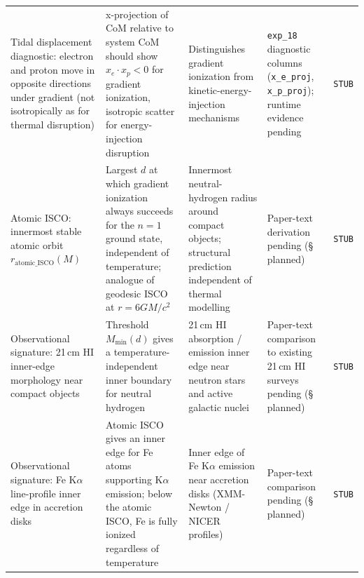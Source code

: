 {\begin{longtable}{@{}p{2.8cm}p{3.6cm}p{3.6cm}p{4.0cm}p{1.0cm}@{}}
Tidal displacement diagnostic:
electron and proton move in opposite directions under gradient
(not isotropically as for thermal disruption)
    & x-projection of CoM relative to system CoM should show
      $x_e \cdot x_p < 0$ for gradient ionization, isotropic
      scatter for energy-injection disruption
    & Distinguishes gradient ionization from
      kinetic-energy-injection mechanisms
    & \texttt{exp\_18} diagnostic columns
      (\texttt{x\_e\_proj}, \texttt{x\_p\_proj}); runtime evidence
      pending
    & \texttt{STUB} \\

Atomic ISCO: innermost stable atomic orbit
$r_\text{atomic\_ISCO}(M)$
    & Largest $d$ at which gradient ionization always succeeds
      for the $n=1$ ground state, independent of temperature;
      analogue of geodesic ISCO at $r = 6 GM / c^2$
    & Innermost neutral-hydrogen radius around compact objects;
      structural prediction independent of thermal modelling
    & Paper-text derivation pending (\S\,planned)
    & \texttt{STUB} \\

Observational signature:
21\,cm HI inner-edge morphology near compact objects
    & Threshold $M_\text{min}(d)$ gives a temperature-independent
      inner boundary for neutral hydrogen
    & 21\,cm HI absorption / emission inner edge near neutron stars
      and active galactic nuclei
    & Paper-text comparison to existing 21\,cm HI surveys pending
      (\S\,planned)
    & \texttt{STUB} \\

Observational signature:
Fe K$\alpha$ line-profile inner edge in accretion disks
    & Atomic ISCO gives an inner edge for Fe atoms supporting
      K$\alpha$ emission; below the atomic ISCO, Fe is fully
      ionized regardless of temperature
    & Inner edge of Fe K$\alpha$ emission near accretion disks
      (XMM-Newton / NICER profiles)
    & Paper-text comparison pending (\S\,planned)
    & \texttt{STUB} \\

\hline
\end{longtable}
}
